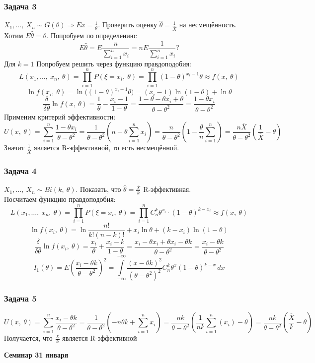 \documentclass[12pt, a4paper]{article}
\begin{document}
\subsubsection*{Задача 3}
$X_1,\dots,\ X_n \sim G(\theta)\Rightarrow Ex = \frac{1}{\theta}$. Проверить оценку $\hat{\theta} = \frac{1}{\overline{X}}$ на несмещённость.\\
Хотим $E\hat{\theta} = \theta$. Попробуем по определению:
\[E\hat{\theta} = E \frac{n}{\sum\limits_{i = 1}^{n} x_i} = n E\frac{1}{\sum\limits_{i = 1}^{n} x_i}?\]
Для $k = 1$
Попробуем решить через функцию правдоподобия:
\[L(x_1,\dots,\ x_n,\ \theta) = \prod_{i = 1}^{n} P(\xi = x_i,\ \theta) = \prod_{i = 1}^{n} (1 - \theta)^{x_i - 1}\theta \approx f(x,\ \theta)\]
\[\ln f(x_i,\ \theta) = \ln \big( (1 - \theta)^{x_i - 1} \theta \big) = (x_i - 1)\ln (1 - \theta) + \ln \theta\]
\[\frac{\delta}{\delta \theta} \ln f(x,\ \theta) = \frac{1}{\theta} - \frac{x_i - 1}{1 - \theta} = \frac{1 - \theta - \theta x_i + \theta}{\theta - \theta^2} = \frac{1 - \theta x_i}{\theta - \theta^2}\]
Применим критерий эффективности:
\[U(x,\ \theta) = \sum_{i = 1}^{n} \frac{1 - \theta x_i}{\theta - \theta^2} = \frac{1}{\theta - \theta^2} \left( n - \theta \sum_{i = 1}^{n} x_i \right) = \frac{n}{\theta - \theta^2} \left( 1 - \frac{\theta}{n} \sum_{i = 1}^{n} \right) = \frac{n\overline{X}}{\theta - \theta^2} \left( \frac{1}{\overline{X}} - \theta \right)\]
Значит $\frac{1}{\overline{X}}$ является R-эффективной, то есть несмещённой.
\subsubsection*{Задача 4}
$X_1,\dots,\ X_n \sim Bi(k,\ \theta)$. Показать, что $\hat{\theta}  = \frac{\overline{X}}{k}$ R-эффективная.\\
Посчитаем функцию правдоподобия:
\[L(x_1,\dots,\ x_n,\ \theta) = \prod_{i = 1}^{n} P(\xi = x_i,\ \theta) = \prod_{i = 1}^{n} C_n^k\theta^{x_i}\cdot (1 - \theta)^{k - x_i} \approx f(x,\ \theta)\]
\[\ln f(x_i,\ \theta) = \ln\frac{n!}{k!(n - k)!} + x_i \ln \theta + (k - x_i)\ln (1 - \theta)\]
\[\frac{\delta}{\delta \theta} \ln f(x_i,\ \theta) = \frac{x_i}{\theta} + \frac{x_i - k}{1 - \theta} = \frac{x_i - \theta x_i + \theta x_i - \theta k}{\theta - \theta^2} = \frac{x_i - \theta k}{\theta - \theta^2}\]
\[I_1(\theta) = E \left( \frac{x_i - \theta k}{\theta - \theta^2} \right)^2 = \int\limits_{-\infty}^{+\infty} \frac{(x - \theta k)^2}{(\theta - \theta^2)^2} C_n^k \theta^{x} (1 - \theta)^{k - x}\, dx\]
\subsubsection*{Задача 5}
\[U(x,\ \theta) = \sum_{i = 1}^{n} \frac{x_i - \theta k}{\theta - \theta^2} = \frac{1}{\theta - \theta^2}\left(-n\theta k + \sum_{i = 1}^{n} x_i\right) = \frac{nk}{\theta - \theta^2}\left( \frac{1}{nk} \sum_{i = 1}^{n} (x_i) - \theta \right) = \frac{nk}{\theta - \theta^2} \left( \frac{\overline{X}}{k} - \theta \right)\]
Получается, что $\frac{\overline{X}}{k}$ является R-эффективной
\begin{center}
    \bf Семинар 31 января
\end{center}
\end{document}
